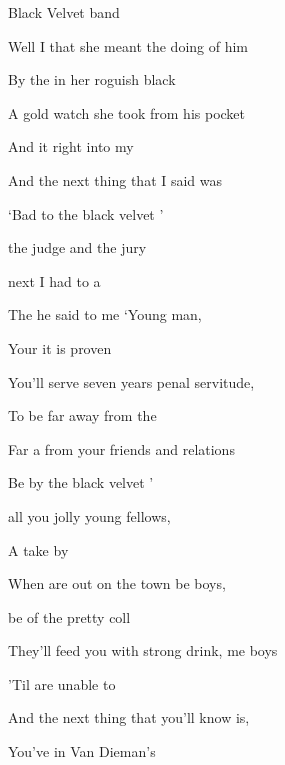 \begin{SBSong}{Black Velvet band}
\begin{SBVerse}
    Well I  that she meant the doing of him 
    
    By the  in her roguish black 

    A gold watch she took from his pocket
    
    And  it right into my 

    And the  next thing that I said was 
    
    `Bad  to the black velvet '
  \end{SBVerse}
  \begin{SBVerse}
     the judge and the jury 
    
    next  I had to a
    
    The  he said to me `Young man, 
    
    Your  it is proven 
    
    You'll serve seven years penal servitude, 
    
    To be  far away from the 

    Far a from your friends and relations 
    
    Be by the black velvet '
  \end{SBVerse}
  \begin {SBVerse}
     all you jolly young fellows, 
  
    A  take by 
  
    When  are out on the town be boys, 
  
    be of the pretty coll
  
    They'll feed you with strong drink, me boys
    
    'Til  are unable to 
  
    And the  next thing that you'll know is,
    
    You've  in Van Dieman's 
  \end{SBVerse}
\end{SBSong}
 
